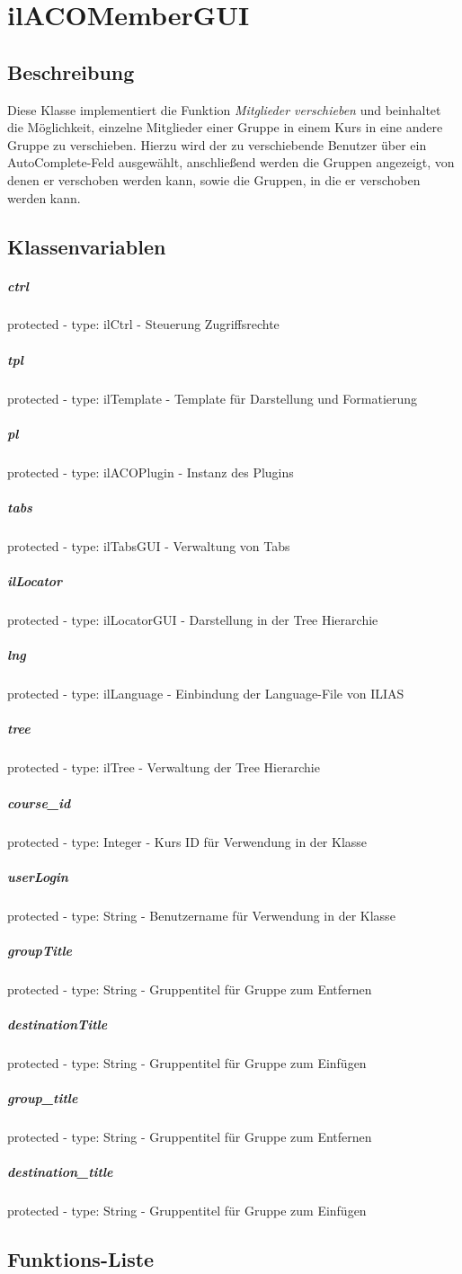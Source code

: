 \section{ilACOMemberGUI}

\subsection*{Beschreibung}
Diese Klasse implementiert die Funktion \textit{Mitglieder verschieben} und beinhaltet die Möglichkeit, einzelne Mitglieder einer Gruppe in einem Kurs in eine andere Gruppe zu verschieben. 
Hierzu wird der zu verschiebende Benutzer über ein AutoComplete-Feld ausgewählt, anschließend werden die Gruppen angezeigt, von denen er verschoben werden kann, sowie die Gruppen, in die er verschoben werden kann.

\subsection*{Klassenvariablen}
\subparagraph{ctrl}
protected - type: ilCtrl - Steuerung Zugriffsrechte
\subparagraph{tpl}
protected - type: ilTemplate - Template für Darstellung und Formatierung
\subparagraph{pl}
protected - type: ilACOPlugin - Instanz des Plugins
\subparagraph{tabs}
protected - type: ilTabsGUI - Verwaltung von Tabs
\subparagraph{ilLocator}
protected - type: ilLocatorGUI - Darstellung in der Tree Hierarchie
\subparagraph{lng}
protected - type: ilLanguage - Einbindung der Language-File von ILIAS
\subparagraph{tree}
protected - type: ilTree - Verwaltung der Tree Hierarchie
\subparagraph{course\_id}
protected - type: Integer - Kurs ID für Verwendung in der Klasse
\subparagraph{userLogin}
protected - type: String - Benutzername für Verwendung in der Klasse
\subparagraph{groupTitle}
protected - type: String - Gruppentitel für Gruppe zum Entfernen
\subparagraph{destinationTitle}
protected - type: String - Gruppentitel für Gruppe zum Einfügen
\subparagraph{group\_title}
protected - type: String - Gruppentitel für Gruppe zum Entfernen
\subparagraph{destination\_title}
protected - type: String - Gruppentitel für Gruppe zum Einfügen


\subsection*{Funktions-Liste}
\paragraph{}
